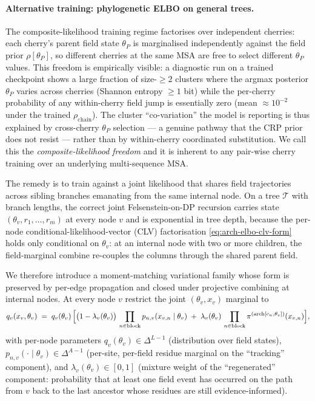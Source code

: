 \paragraph{Alternative training: phylogenetic ELBO on general trees.}
\label{par:arch-phylo-elbo}
The composite-likelihood training regime factorises over independent
cherries: each cherry's parent field state $\theta_P$ is
marginalised independently against the field prior $\rho[\theta_P]$,
so different cherries at the same MSA are free to select different
$\theta_P$ values. This freedom is empirically visible: a diagnostic
run on a trained checkpoint shows a large fraction of size-$\geq\!2$
clusters where the argmax posterior $\theta_P$ varies across
cherries (Shannon entropy $\geq 1$ bit) while the per-cherry
probability of any within-cherry field jump is essentially zero (mean
$\approx 10^{-2}$ under the trained $\rho_{\text{chain}}$). The
cluster ``co-variation'' the model is reporting is thus explained by
cross-cherry $\theta_P$ selection --- a genuine pathway that the
CRP prior does not resist --- rather than by within-cherry
coordinated substitution. We call this the \emph{composite-likelihood
freedom} and it is inherent to any pair-wise cherry training over an
underlying multi-sequence MSA.

The remedy is to train against a joint likelihood that shares field
trajectories across sibling branches emanating from the same internal
node. On a tree $\mathcal{T}$ with branch lengths, the correct joint
Felsenstein-on-DP recursion carries state $(\theta_v, r_1, \ldots,
r_{m})$ at every node $v$ and is exponential in tree depth,
because the per-node conditional-likelihood-vector (CLV) factorisation
\eqref{eq:arch-elbo-clv-form} holds only conditional on
$\theta_v$: at an internal node with two or more children, the
field-marginal combine re-couples the columns through the shared
parent field.

We therefore introduce a moment-matching variational family whose
form is preserved by per-edge propagation and closed under
projective combining at internal nodes. At every node $v$ restrict
the joint $(\theta_v, x_v)$ marginal to
\begin{equation}
  q_v(x_v, \theta_v) \;=\; q_v(\theta_v) \,\Bigl[
    \bigl(1 - \lambda_v(\theta_v)\bigr)
        \,\prod_{n \in \mathrm{block}} p_{n,v}(x_{v,n} \mid \theta_v)
    \;+\; \lambda_v(\theta_v)
        \,\prod_{n \in \mathrm{block}} \pi^{(\mathrm{arch}[c_n, \theta_v])}(x_{v,n})
  \Bigr],
  \label{eq:arch-elbo-family}
\end{equation}
with per-node parameters $q_v(\theta_v) \in \Delta^{L-1}$
(distribution over field states), $p_{n, v}(\cdot \mid \theta_v)
\in \Delta^{A-1}$ (per-site, per-field residue marginal on the
``tracking'' component), and $\lambda_v(\theta_v) \in [0, 1]$
(mixture weight of the ``regenerated'' component: probability that
at least one field event has occurred on the path from $v$ back to
the last ancestor whose residues are still evidence-informed).


